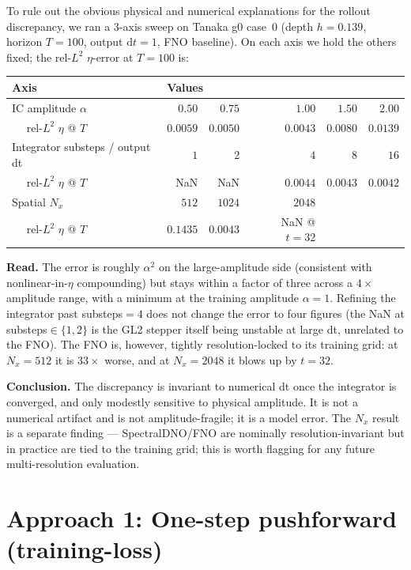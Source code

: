 \documentclass[11pt,letterpaper]{article}
\begin{document}
To rule out the obvious physical and numerical explanations for the
rollout discrepancy, we ran a 3-axis sweep on Tanaka g0 case~0
(depth $h{=}0.139$, horizon $T{=}100$, output $\mathrm{d}t{=}1$,
FNO baseline). On each axis we hold the others fixed; the rel-$L^{2}$
$\eta$-error at $T=100$ is:
\begin{center}
\small
\begin{tabular}{lrrrrr}
\toprule
\textbf{Axis} & \multicolumn{5}{l}{\textbf{Values}} \\
\midrule
IC amplitude $\alpha$ & $0.50$ & $0.75$ & $1.00$ & $1.50$ & $2.00$ \\
$\quad$ rel-$L^{2}$ $\eta$ @ $T$ & $0.0059$ & $0.0050$ & $0.0043$ & $0.0080$ & $0.0139$ \\
\midrule
Integrator substeps / output dt & $1$ & $2$ & $4$ & $8$ & $16$ \\
$\quad$ rel-$L^{2}$ $\eta$ @ $T$ & NaN & NaN & $0.0044$ & $0.0043$ & $0.0042$ \\
\midrule
Spatial $N_x$ & $512$ & $1024$ & $2048$ & & \\
$\quad$ rel-$L^{2}$ $\eta$ @ $T$ & $0.1435$ & $0.0043$ & NaN @ $t{=}32$ & & \\
\bottomrule
\end{tabular}
\end{center}
\noindent
\textbf{Read.} The error is roughly $\alpha^{2}$ on the large-amplitude
side (consistent with nonlinear-in-$\eta$ compounding) but stays within
a factor of three across a $4\times$ amplitude range, with a minimum at
the training amplitude $\alpha = 1$. Refining the integrator past
substeps${=}4$ does not change the error to four figures
(the NaN at substeps${\in}\{1,2\}$ is the GL2 stepper itself being
unstable at large dt, unrelated to the FNO). The FNO is, however,
tightly resolution-locked to its training grid: at $N_x{=}512$ it is
$33\times$ worse, and at $N_x{=}2048$ it blows up by $t{=}32$.

\textbf{Conclusion.} The discrepancy is invariant to numerical dt once
the integrator is converged, and only modestly sensitive to physical
amplitude. It is not a numerical artifact and is not amplitude-fragile;
it is a model error. The $N_x$ result is a separate finding ---
SpectralDNO/FNO are nominally resolution-invariant but in practice are
tied to the training grid; this is worth flagging for any future
multi-resolution evaluation.

\section{Approach 1: One-step pushforward (training-loss)}
\end{document}
